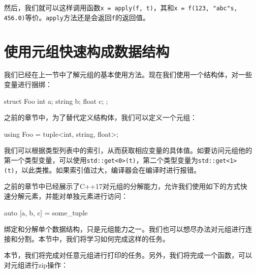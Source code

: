 然后，我们就可以这样调用函数\texttt{x = apply(f, t)}，其和\texttt{x = f(123, "abc"s, 456.0)}等价。\texttt{apply}方法还是会返回\texttt{f}的返回值。


\section{使用元组快速构成数据结构}

我们已经在上一节中了解元组的基本使用方法。现在我们使用一个结构体，对一些变量进行捆绑：

\begin{codebox}[cpp]
struct Foo {
  int a;
  string b;
  float c;
};
\end{codebox}

之前的章节中，为了替代定义结构体，我们可以定义一个元组：

\begin{codebox}[cpp]
using Foo = tuple<int, string, float>;
\end{codebox}

我们可以根据类型列表中的索引，从而获取相应变量的具体值。如要访问元组他的第一个类型变量，可以使用\texttt{std::get<0>(t)}，第二个类型变量为\texttt{std::get<1>(t)}，以此类推。如果索引值过大，编译器会在编译时进行报错。

之前的章节中已经展示了C++17对元组的分解能力，允许我们使用如下的方式快速分解元素，并能对单独元素进行访问：

\begin{codebox}[cpp]
auto [a, b, c] = some_tuple
\end{codebox}

绑定和分解单个数据结构，只是元组能力之一。我们也可以想尽办法对元组进行连接和分割。本节中，我们将学习如何完成这样的任务。


本节，我们将完成对任意元组进行打印的任务。另外，我们将完成一个函数，可以对元组进行zip操作：

